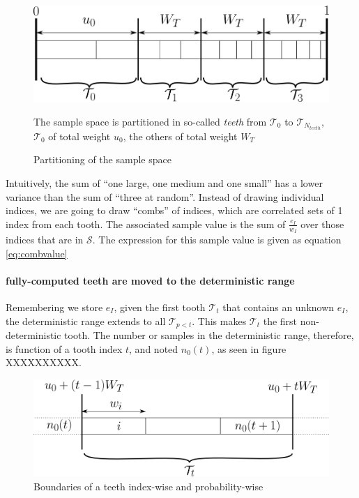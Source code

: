 \documentclass[./thesis.tex]{subfiles}
\begin{document}
 \begin{figure}[h!]
	\begin{center}
		\includegraphics[width=0.9\columnwidth]{figures/pt2/teeth}
		\caption{Partitioning of the sample space}
		\label{fig:teeth}
		The sample space is partitioned in so-called \emph{teeth} from $\mathcal{T}_0$ to $\mathcal{T}_{N_{teeth}}$, $\mathcal{T}_0$ of total weight $u_0$, the others of total weight $W_T$
	\end{center}
\end{figure}

Intuitively, the sum of ``one large, one medium and one small'' has a lower variance than the sum of ``three at random''. Instead of drawing individual indices, we are going to draw ``combs'' of indices, which are correlated sets of 1 index from each tooth. The associated sample value is the sum of $\frac{e_I}{w_I}$ over those indices that are in $\mathcal{S}$.  The expression for this sample value is given as equation \ref{eq:combvalue}

\paragraph{fully-computed teeth are moved to the deterministic range}

Remembering we store $e_I$, given the first tooth $\mathcal{T}_t$ that contains an unknown $e_I$, the deterministic range extends to all $\mathcal{T}_{p<t}$. This makes $\mathcal{T}_t$ the first non-deterministic tooth.
The number or samples in the deterministic range, therefore, is function of a tooth index $t$, and noted $n_0(t)$, as seen in figure XXXXXXXXXX.


 \begin{figure}[h!]
	\begin{center}
		\includegraphics[width=0.9\columnwidth]{figures/pt2/tooththreshold}
		\caption{Boundaries of a teeth index-wise and probability-wise}
		\label{fig:teeth}
		
	\end{center}
\end{figure}
\end{document}
